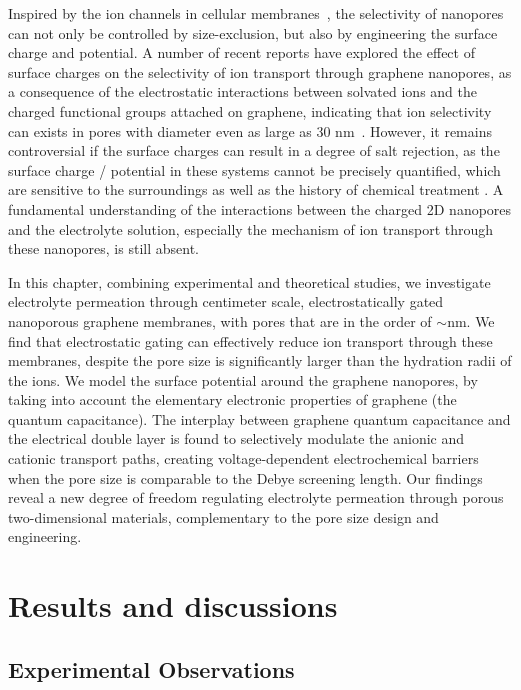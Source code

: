 Inspired by the ion channels in cellular
membranes~\cite{Chung_2007_biological_ion_chan}, the selectivity of
nanopores can not only be controlled by size-exclusion, but also by
engineering the surface charge and potential.
%
A number of recent reports have explored the effect of surface charges
on the selectivity of ion transport through graphene nanopores, as a
consequence of the electrostatic interactions between solvated ions
and the charged functional groups attached on graphene, indicating
that ion selectivity can exists in pores with diameter even as large
as 30 nm~\cite{Rollings_2016_gating,Surwade_2014_carbon_electrochemical_ion}.
%
However, it remains controversial if the surface charges can result in
a degree of salt rejection, as the surface charge / potential in these systems
cannot be precisely quantified, which are sensitive to the surroundings
as well as the history of chemical treatment
\cite{Li_2008_gr_suspension}.
%
A fundamental understanding of the interactions between the charged 2D
nanopores and the electrolyte solution, especially the mechanism of
ion transport through these nanopores, is still absent.

In this chapter, combining experimental and theoretical studies, we
investigate electrolyte permeation through centimeter scale,
electrostatically gated nanoporous graphene membranes, with pores that
are in the order of $\sim{}$\unit[20]{nm}.
%
We find that electrostatic gating can effectively reduce ion transport
through these membranes, despite the pore size is significantly larger
than the hydration radii of the ions. We model the surface potential
around the graphene nanopores, by taking into account the elementary
electronic properties of graphene (\eg the quantum capacitance).
%
The interplay between graphene quantum capacitance and the electrical
double layer is found to selectively modulate the anionic and cationic
transport paths, creating voltage-dependent electrochemical barriers
when the pore size is comparable to the Debye screening length. Our findings
reveal a new degree of freedom regulating electrolyte permeation
through porous two-dimensional materials, complementary to the pore
size design and engineering.

\section{Results and discussions}
\label{sec:np-np-res}

\subsection{Experimental Observations}
\label{sec:np-np-exper-observ}

